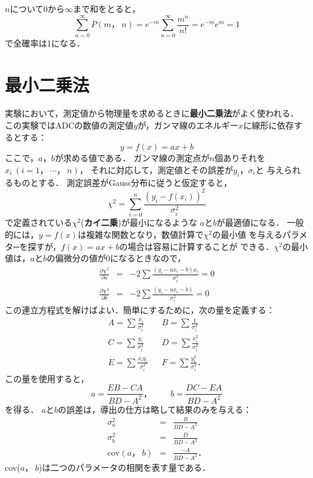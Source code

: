\documentclass[a4j,10pt,oneside,openany]{jsbook}
\begin{document}
{$n$について0から$\infty$まで和をとると，
\begin{equation}
  \sum_{n=0}^{\infty}P(m，~n)=e^{-m}\sum_{n=0}^{\infty}\frac{m^n}{n!}
  =e^{-m}e^m=1
\end{equation}
で全確率は1になる．

\newpage

\section{最小二乗法}\label{appendix-b}

実験において，測定値から物理量を求めるときに{\bf 最小二乗法}がよく使われる．
この実験ではADCの数値の測定値$y$が，ガンマ線のエネルギー$x$に線形に依存するとする：
\begin{equation}
  y = f(x)= a x + b
\end{equation}
ここで，$a$，$b$が求める値である．
ガンマ線の測定点が$n$個ありそれを$x_i~(i=1，~\cdots，~n)$，
それに対応して，測定値とその誤差が$y_i$，$\sigma_i$と
与えられるものとする．
測定誤差がGauss分布に従うと仮定すると，
\begin{equation}
  \chi^2 = \sum_{i=0}^n\frac{(y_i - f(x_i))^2}{\sigma_i^2}
\end{equation}
で定義されている$\chi^2$({\bf カイ二乗})が最小になるような
$a$と$b$が最適値になる．
一般的には，$y=f(x)$は複雑な関数となり，数値計算で$\chi^2$の最小値
を与えるパラメタ─を探すが，$f(x)=ax+b$の場合は容易に計算することが
できる．$\chi^2$の最小値は，$a$と$b$の偏微分の値が0になるときなので，
\begin{eqnarray}
  \frac{\partial \chi^2}{\partial a} &=&
  -2\sum\frac{(y_i-ax_i-b)x_i}{\sigma_i^2}=0 \\
  \frac{\partial \chi^2}{\partial b} &=&
  -2\sum\frac{(y_i-ax_i-b)}{\sigma_i^2}=0
\end{eqnarray}
この連立方程式を解けばよい．簡単にするために，次の量を定義する：
\begin{eqnarray}
  A = \sum\frac{x_i}{\sigma_i^2} & & B = \sum\frac{1}{\sigma_i^2}
  \nonumber\\
  C = \sum\frac{y_i}{\sigma_i^2} & & D = \sum\frac{x_i^2}{\sigma_i^2}
  \\
  E = \sum\frac{x_iy_i}{\sigma_i^2} & & F = \sum\frac{y_i^2}{\sigma_i^2}．
  \nonumber
\end{eqnarray}
この量を使用すると，
\begin{equation}
  a = \frac{EB-CA}{BD-A^2}，~~~~~~~~~~b=\frac{DC-EA}{BD-A^2}
\end{equation}
を得る．
$a$と$b$の誤差は，導出の仕方は略して結果のみを与える：
\begin{eqnarray}
  \sigma_a^2 &=& \frac{B}{BD-A^2} \nonumber \\
  \sigma_b^2 &=& \frac{D}{BD-A^2}\\
  \mbox{cov}(a，~b) &=& \frac{-A}{BD-A^2}\nonumber．
\end{eqnarray}
cov($a，~b$)は二つのパラメータの相関を表す量である．


}
\end{document}
